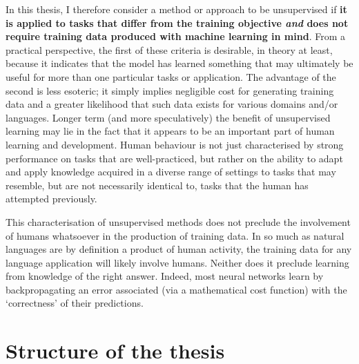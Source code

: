 In this thesis, I therefore consider a method or approach to be unsupervised if {\bf it is applied to tasks that differ from the training objective \emph{and} does not require training data produced with machine learning in mind}. From a practical perspective, the first of these criteria is desirable, in theory at least, because it indicates that the model has learned something that may ultimately be useful for more than one particular tasks or application. The advantage of the second is less esoteric; it simply implies negligible cost for generating training data and a greater likelihood that such data exists for various domains and/or languages. Longer term (and more speculatively) the benefit of unsupervised learning may lie in the fact that it appears to be an important part of human learning and development. Human behaviour is not just characterised by strong performance on tasks that are well-practiced, but rather on the ability to adapt and apply knowledge acquired in a diverse range of settings to tasks that may resemble, but are not necessarily identical to, tasks that the human has attempted previously.  

This characterisation of unsupervised methods does not preclude the involvement of humans whatsoever in the production of training data. In so much as natural languages are by definition a product of human activity, the training data for any language application will likely involve humans. Neither does it preclude learning from knowledge of the right answer. Indeed, most neural networks learn by backpropagating an error associated (via a mathematical cost function) with the `correctness' of their predictions. 

\section*{Structure of the thesis}

